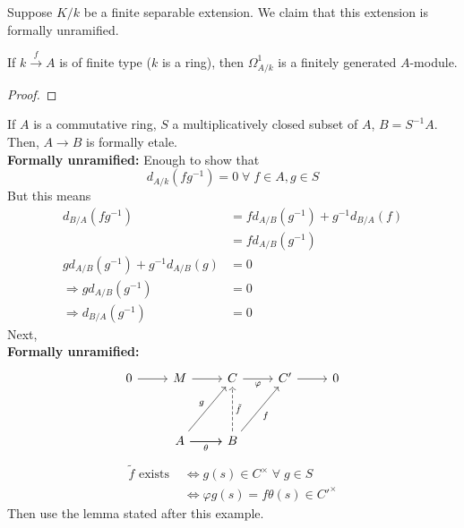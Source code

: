 \documentclass[oneside, 12pt, ]{scrbook}
\theoremstyle{theorem}
\begin{document}
\begin{exercise}
Suppose $K/k$ be a finite separable extension. We claim that this extension is formally unramified. 
\end{exercise}

\begin{lemma}
If $k \xrightarrow{f} A $ is of finite type ($k$ is a ring), then $\Omega_{A/k}^{1}$ is a finitely generated $A$-module.
\end{lemma}

\begin{proof}

\end{proof}

\begin{example}
If $A$ is a commutative ring, $S$ a multiplicatively closed subset of $A$, $B = S^{-1}A$. Then, $A \rightarrow B$ is formally etale. \\

\textbf{Formally unramified:} Enough to show that $$d_{A/k}(fg^{-1}) = 0 \; \forall \; f \in A , g\in S$$ But this means 
\begin{align*}
d_{B/A}(fg^{-1}) &= fd_{A/B} (g^{-1}) + g^{-1}d_{B/A}(f) \\
&= fd_{A/B}(g^{-1}) \\
gd_{A/B}(g^{-1}) + g^{-1}d_{A/B}(g) &= 0 \\
\Rightarrow gd_{A/B}(g^{-1}) &= 0 \\
\Rightarrow d_{B/A}(g^{-1}) &= 0
\end{align*}
Next, \\
\textbf{Formally unramified:}
\[\begin{tikzcd}
	0 & M & C & {C'} & 0 \\
	\\
	& A & B
	\arrow["g", from=3-2, to=1-3]
	\arrow["{\tilde{f}}"', dashed, from=3-3, to=1-3]
	\arrow["\theta"', from=3-2, to=3-3]
	\arrow[from=3-2, to=3-3]
	\arrow[from=1-1, to=1-2]
	\arrow[from=1-2, to=1-3]
	\arrow["\varphi"', from=1-3, to=1-4]
	\arrow[from=1-4, to=1-5]
	\arrow["f"', from=3-3, to=1-4]
\end{tikzcd}\]
\begin{align*}
\tilde{f} \text{ exists } &\Leftrightarrow g(s) \in C^{\times} \;\forall \; g \in S \\
&\Leftrightarrow \varphi g(s) = f\theta(s) \in C'^{\times}
\end{align*}
Then use the lemma stated after this example.
\end{example}
\end{document}
